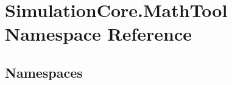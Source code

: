\hypertarget{namespace_simulation_core_1_1_math_tool}{}\section{Simulation\+Core.\+Math\+Tool Namespace Reference}
\label{namespace_simulation_core_1_1_math_tool}
\subsection*{Namespaces}
\begin{DoxyCompactItemize}
\end{DoxyCompactItemize}
